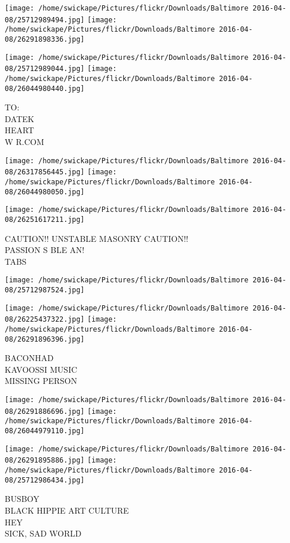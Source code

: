 \documentclass[10pt,letterpaper]{article}
\begin{document}
\texttt{[image: /home/swickape/Pictures/flickr/Downloads/Baltimore 2016-04-08/25712989494.jpg]}
\texttt{[image: /home/swickape/Pictures/flickr/Downloads/Baltimore 2016-04-08/26291898336.jpg]}

\texttt{[image: /home/swickape/Pictures/flickr/Downloads/Baltimore 2016-04-08/25712989044.jpg]}
\texttt{[image: /home/swickape/Pictures/flickr/Downloads/Baltimore 2016-04-08/26044980440.jpg]}

TO:\\
DATEK\\
HEART\\
W R.COM
\pagebreak

\texttt{[image: /home/swickape/Pictures/flickr/Downloads/Baltimore 2016-04-08/26317856445.jpg]}
\texttt{[image: /home/swickape/Pictures/flickr/Downloads/Baltimore 2016-04-08/26044980050.jpg]}

\texttt{[image: /home/swickape/Pictures/flickr/Downloads/Baltimore 2016-04-08/26251617211.jpg]}

CAUTION!! UNSTABLE MASONRY CAUTION!!\\
PASSION S BLE AN!\\
TABS
\pagebreak

\texttt{[image: /home/swickape/Pictures/flickr/Downloads/Baltimore 2016-04-08/25712987524.jpg]}

\vspace{0.25in}
\texttt{[image: /home/swickape/Pictures/flickr/Downloads/Baltimore 2016-04-08/26225437322.jpg]}
\texttt{[image: /home/swickape/Pictures/flickr/Downloads/Baltimore 2016-04-08/26291896396.jpg]}

BACONHAD\\
KAVOOSSI MUSIC\\
MISSING PERSON
\pagebreak

\texttt{[image: /home/swickape/Pictures/flickr/Downloads/Baltimore 2016-04-08/26291886696.jpg]}
\texttt{[image: /home/swickape/Pictures/flickr/Downloads/Baltimore 2016-04-08/26044979110.jpg]}

\texttt{[image: /home/swickape/Pictures/flickr/Downloads/Baltimore 2016-04-08/26291895886.jpg]}
\texttt{[image: /home/swickape/Pictures/flickr/Downloads/Baltimore 2016-04-08/25712986434.jpg]}

BUSBOY\\
BLACK HIPPIE ART CULTURE\\
HEY\\
SICK, SAD WORLD
\pagebreak
\end{document}
